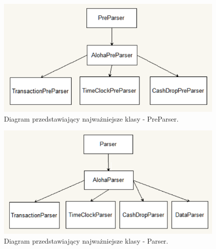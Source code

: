 \documentclass[a4paper]{book}
\begin{document}
\begin{figure}[t]
	\centering
	\includegraphics{./img/preparser_diagram_klas.png}
	\caption{Diagram przedstawiający najważniejsze klasy - PreParser.}
	\label{fig:preparser_diagram_klas}
\end{figure}
\begin{figure}[t]
	\centering
	\includegraphics{./img/parser_diagram_klas.png}
	\caption{Diagram przedstawiający najważniejsze klasy - Parser.}
	\label{fig:parser_diagram_klas}
\end{figure}
\end{document}
